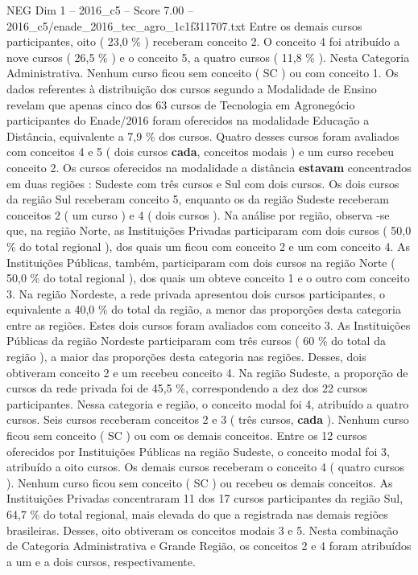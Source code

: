 \begin{textsample}{NEG Dim 1 – 2016\_c5 – Score 7.00 – 2016\_c5/enade\_2016\_tec\_agro\_1c1f311707.txt}
Entre os demais cursos participantes, oito ( 23,0 \% ) receberam conceito 2.
O conceito 4 foi atribuído a nove cursos ( 26,5 \% ) e o conceito 5, a quatro cursos ( 11,8 \% ).
Nesta Categoria Administrativa.
Nenhum curso ficou sem conceito ( SC ) ou com conceito 1.
Os dados referentes à distribuição dos cursos segundo a Modalidade de Ensino revelam que apenas cinco dos 63 cursos de Tecnologia em Agronegócio participantes do Enade/2016 foram oferecidos na modalidade Educação a Distância, equivalente a 7,9 \% dos cursos.
Quatro desses cursos foram avaliados com conceitos 4 e 5 ( dois cursos \textbf{cada}, conceitos modais ) e um curso recebeu conceito 2.
Os cursos oferecidos na modalidade a distância \textbf{estavam} concentrados em duas regiões : Sudeste com três cursos e Sul com dois cursos.
Os dois cursos da região Sul receberam conceito 5, enquanto os da região Sudeste receberam conceitos 2 ( um curso ) e 4 ( dois cursos ).
Na análise por região, observa -se que, na região Norte, as Instituições Privadas participaram com dois cursos ( 50,0 \% do total regional ), dos quais um ficou com conceito 2 e um com conceito 4.
As Instituições Públicas, também, participaram com dois cursos na região Norte ( 50,0 \% do total regional ), dos quais um obteve conceito 1 e o outro com conceito 3.
Na região Nordeste, a rede privada apresentou dois cursos participantes, o equivalente a 40,0 \% do total da região, a menor das proporções desta categoria entre as regiões.
Estes dois cursos foram avaliados com conceito 3.
As Instituições Públicas da região Nordeste participaram com três cursos ( 60 \% do total da região ), a maior das proporções desta categoria nas regiões.
Desses, dois obtiveram conceito 2 e um recebeu conceito 4.
Na região Sudeste, a proporção de cursos da rede privada foi de 45,5 \%, correspondendo a dez dos 22 cursos participantes.
Nessa categoria e região, o conceito modal foi 4, atribuído a quatro cursos.
Seis cursos receberam conceitos 2 e 3 ( três cursos, \textbf{cada} ).
Nenhum curso ficou sem conceito ( SC ) ou com os demais conceitos.
Entre os 12 cursos oferecidos por Instituições Públicas na região Sudeste, o conceito modal foi 3, atribuído a oito cursos.
Os demais cursos receberam o conceito 4 ( quatro cursos ).
Nenhum curso ficou sem conceito ( SC ) ou recebeu os demais conceitos.
As Instituições Privadas concentraram 11 dos 17 cursos participantes da região Sul, 64,7 \% do total regional, mais elevada do que a registrada nas demais regiões brasileiras.
Desses, oito obtiveram os conceitos modais 3 e 5.
Nesta combinação de Categoria Administrativa e Grande Região, os conceitos 2 e 4 foram atribuídos a um e a dois cursos, respectivamente.

\end{textsample}
